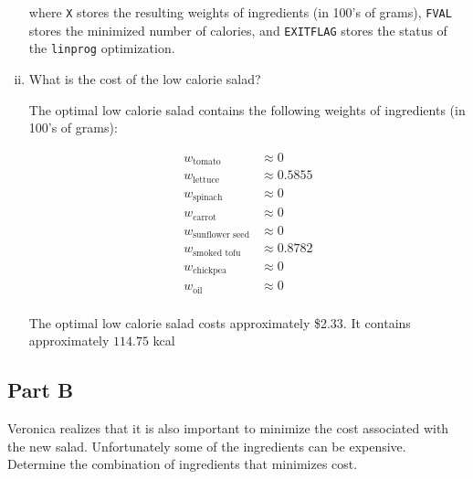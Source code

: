 \documentclass[../main.tex]{subfiles}
\begin{document}
\begin{enumerate}[i.]
	

	where \verb|X| stores the resulting weights of ingredients (in 100's of grams), \verb|FVAL| stores the minimized number of calories, and \verb|EXITFLAG| stores the status of the \verb|linprog| optimization.

	\item What is the cost of the low calorie salad?

	The optimal low calorie salad contains the following weights of ingredients (in 100's of grams):

	\begin{equation*}
		\begin{aligned}
			w_{\text{tomato}} &\approx 0 \\
			w_{\text{lettuce}} &\approx 0.5855 \\
			w_{\text{spinach}} &\approx 0 \\
			w_{\text{carrot}} &\approx 0 \\
			w_{\text{sunflower seed}} &\approx 0 \\
			w_{\text{smoked tofu}} &\approx 0.8782 \\
			w_{\text{chickpea}} &\approx 0 \\
			w_{\text{oil}} &\approx 0 \\
		\end{aligned}
	\end{equation*}

	The optimal low calorie salad costs approximately \$2.33. It contains approximately $114.75$ kcal
\end{enumerate}

\subsection*{Part B}
Veronica realizes that it is also important to minimize the cost associated with the new salad. Unfortunately some of the ingredients can be expensive. Determine the combination of ingredients that minimizes cost.
\end{document}
